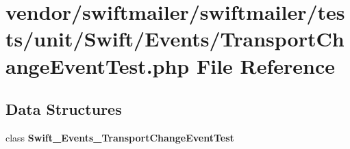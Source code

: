 \section{vendor/swiftmailer/swiftmailer/tests/unit/\+Swift/\+Events/\+Transport\+Change\+Event\+Test.php File Reference}
\label{_transport_change_event_test_8php}
\subsection*{Data Structures}
\begin{DoxyCompactItemize}
\item 
class {\bf Swift\+\_\+\+Events\+\_\+\+Transport\+Change\+Event\+Test}
\end{DoxyCompactItemize}
